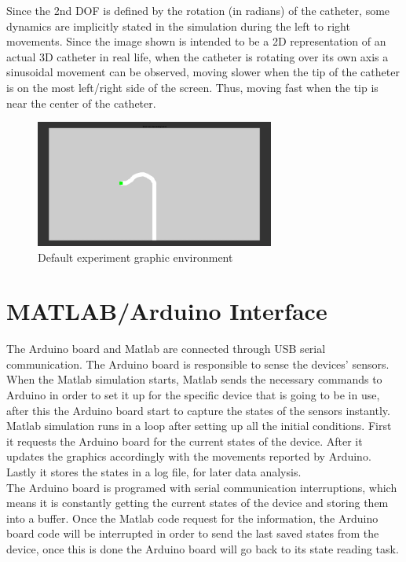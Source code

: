 Since the 2nd DOF is defined by the rotation (in radians) of the catheter, some dynamics are implicitly stated in the simulation during the left to right movements. Since the image shown is intended to be a 2D representation of an actual 3D catheter in real life, when the catheter is rotating over its own axis a sinusoidal movement can be observed, moving slower when the tip of the catheter is on the most left/right side of the screen. Thus, moving fast when the tip is near the center of the catheter.\\

\begin{figure}[ht]
   \centering
   \includegraphics[width=0.7\textwidth]{img/graph.PNG}
   \caption{Default experiment graphic environment}
   \label{img:graph}
\end{figure}

\section{MATLAB/Arduino Interface}\label{sec:matardinter}
The Arduino board and Matlab are connected through USB serial communication. The Arduino board is responsible to sense the devices' sensors. When the Matlab simulation starts, Matlab sends the necessary commands to Arduino in order to set it up for the specific device that is going to be in use, after this the Arduino board start to capture the states of the sensors instantly.\\

Matlab simulation runs in a loop after setting up all the initial conditions. First it requests the Arduino board for the current states of the device. After it updates the graphics accordingly with the movements reported by Arduino. Lastly it stores the states in a log file, for later data analysis.\\

The Arduino board is programed with serial communication interruptions, which means it is constantly getting the current states of the device and storing them into a buffer. Once the Matlab code request for the information, the Arduino board code will be interrupted in order to send the last saved states from the device, once this is done the Arduino board will go back to its state reading task.\\

